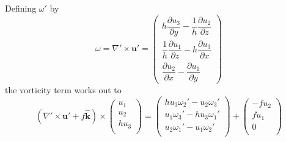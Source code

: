\documentclass[12pt]{article}
\newcommand{\khat}{\hat{\mathbf k}}
\newcommand{\up}{\mathbf u'}
\newcommand{\curlp}{\gradp \times}
\newcommand{\gradp}{\nabla'}
\begin{document}
Defining $\omega'$ by  
\begin{equation}
\label{E:vor}
\omega = \curlp \up = 
\begin{pmatrix}
h \dfrac{\partial u_3}{\partial y} - \dfrac{1}{h} \dfrac{\partial u_2}{\partial z}  \\[5mm]
\dfrac{1}{h} \dfrac{\partial u_1}{\partial z} -  h \dfrac{\partial u_3}{\partial x}  \\[5mm]
\dfrac{\partial u_2}{\partial x} - \dfrac{\partial u_1}{\partial y}
\end{pmatrix}  
\end{equation}
the vorticity term works out to 
\[
(\curlp \up + f\khat) \times 
\begin{pmatrix} u_1 \\
                u_2 \\
                h u_3 \\
\end{pmatrix} = 
\begin{pmatrix}  h  u_3 \omega_2' -  u_2 \omega_3'   \\
                   u_1 \omega_3' -   h u_3 \omega_1'   \\
                u_2 \omega_1' - u_1 \omega_2'   \\
\end{pmatrix}  
+ 
\begin{pmatrix} -f u_2 \\
                f u_1 \\
                0  \\
\end{pmatrix}  
\]
\end{document}
